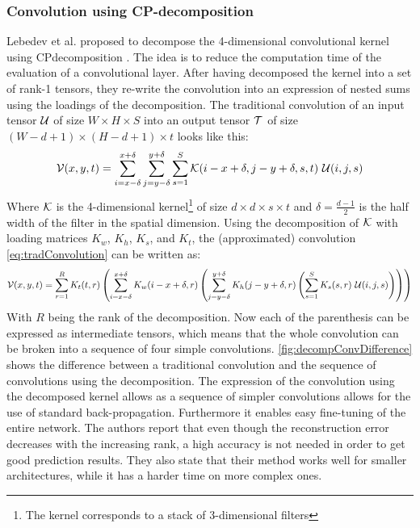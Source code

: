 \subsubsection{Convolution using CP-decomposition} \label{tex:convUsingCP}
Lebedev et al. proposed to decompose the 4-dimensional convolutional kernel using CP\Hyphdash decomposition \cite{Lebedev2015}. The idea is to reduce the computation time of the evaluation of a convolutional layer. After having decomposed the kernel into a set of rank-1 tensors, they re-write the convolution into an expression of nested sums using the loadings of the decomposition. The traditional convolution of an input tensor $\mathcal{U}$ of size $W \times H \times S$ into an output tensor $\mathcal{T}$ of size $(W-d+1)\times (H-d+1)\times t$ looks like this:
\begin{equation}
    \mathcal{V}(x, y, t)=\sum_{i=x-\delta}^{x+\delta} \sum_{j=y-\delta}^{y+\delta} \sum_{s=1}^{S} \mathcal{K}(i-x+\delta, j-y+\delta, s, t) \ \mathcal{U}(i, j, s)
    \label{eq:tradConvolution}
\end{equation}
Where $\mathcal{K}$ is the 4-dimensional kernel\footnote{The kernel corresponds to a stack of 3-dimensional filters} of size $d\times d \times s\times t$ and $\delta = \frac{d-1}{2}$ is the half width of the filter in the spatial dimension. Using the decomposition of $\mathcal{K}$ with loading matrices $K_w$, $K_h$, $K_s$, and $K_t$, the (approximated) convolution \eqref{eq:tradConvolution} can be written as:
\begin{equation}
    \mathcal{V}(x, y, t) = \sum_{r=1}^{R} K_{t}(t, r)\left(\sum_{i=x-\delta}^{x+\delta} K_{w}(i-x+\delta, r)\left(\sum_{j=y-\delta}^{y+\delta} K_{h}(j-y+\delta, r)\left(\sum_{s=1}^{S} K_{s}(s, r) \ \mathcal{U}(i, j, s)\right)\right)\right)
\end{equation}
With $R$ being the rank of the decomposition. Now each of the parenthesis can be expressed as intermediate tensors, which means that the whole convolution can be broken into a sequence of four simple convolutions. \autoref{fig:decompConvDifference} shows the difference between a traditional convolution and the sequence of convolutions using the decomposition. The expression of the convolution using the decomposed kernel allows as a sequence of simpler convolutions allows for the use of standard back-propagation. Furthermore it enables easy fine-tuning of the entire network. The authors report that even though the reconstruction error decreases with the increasing rank, a high accuracy is not needed in order to get good prediction results. They also state that their method works well for smaller architectures, while it has a harder time on more complex ones.

